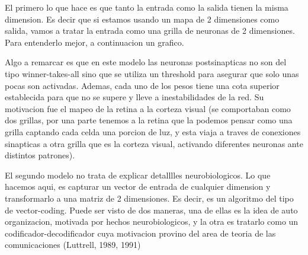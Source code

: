 El primero lo que hace es que tanto la entrada como la salida tienen la misma dimension. Es decir que si estamos usando un mapa de 2 dimensiones como salida, vamos a tratar la entrada como una grilla de neuronas de 2 dimensiones. Para entenderlo mejor, a continuacion un grafico.


Algo a remarcar es que en este modelo las neuronas postsinapticas no son del tipo winner-takes-all sino que se utiliza un threshold para asegurar que solo unas pocas son activadas. Ademas, cada uno de los pesos tiene una cota superior establecida para que no se supere y lleve a inestabilidades de la red. Su motivacion fue el mapeo de la retina a la corteza visual (se comportaban como dos grillas, por una parte tenemos a la retina que la podemos pensar como una grilla captando cada celda una porcion de luz, y esta viaja a traves de conexiones sinapticas a otra grilla que es la corteza visual, activando diferentes neuronas ante distintos patrones).



El segundo modelo no trata de explicar detalllles neurobiologicos. Lo que hacemos aqui, es capturar un vector de entrada de cualquier dimension y transformarlo a una matriz de 2 dimensiones. Es decir, es un algoritmo del tipo de vector-coding. Puede ser visto de dos maneras, una de ellas es la idea de auto organizacion, motivada por hechos neurobiologicos, y la otra es tratarlo como un codificador-decodificador cuya motivacion provino del area de teoria de las comunicaciones (Luttrell, 1989, 1991)